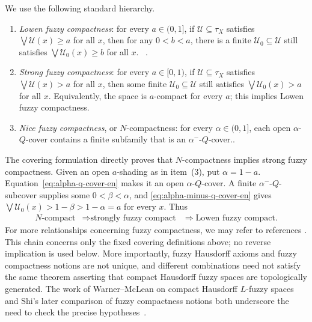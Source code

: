 \documentclass[11pt,a4paper]{article}
\numberwithin{equation}{section}
\theoremstyle{definition}
\theoremstyle{remark}
\begin{document}
We use the following standard hierarchy.
\begin{enumerate}[label=(\arabic*)]
 \item \emph{Lowen fuzzy compactness}: for every \(a\in(0,1]\), if
 \(\mathcal U\subseteq\tau_X\) satisfies
 \(\bigvee\mathcal U(x)\geq a\) for all \(x\), then for any $0<b<a$, there is a finite
 \(\mathcal U_0\subseteq\mathcal U\) still satisfies
 \(\bigvee\mathcal U_0(x)\geq b\) for all \(x\).
 ~\cite{Lowen1976-en,Lowen1978-en}.
 \item \emph{Strong fuzzy compactness}: for every \(a\in[0,1)\), if
 \(\mathcal U\subseteq\tau_X\) satisfies
 \(\bigvee\mathcal U(x)>a\) for all \(x\), then some finite
 \(\mathcal U_0\subseteq\mathcal U\) still satisfies
 \(\bigvee\mathcal U_0(x)>a\) for all \(x\).  Equivalently, the space
 is \(a\)-compact for every \(a\); this implies Lowen fuzzy compactness.
 \item \emph{Nice fuzzy compactness}, or \(N\)-compactness: for every
\(\alpha\in(0,1]\), each open \(\alpha\)-\(Q\)-cover contains a finite
subfamily that is an \(\alpha^{-}\)-\(Q\)-cover..
\end{enumerate}
The covering formulation directly proves that \(N\)-compactness
implies strong fuzzy compactness.  Given an open \(a\)-shading as in
item~(3), put \(\alpha=1-a\).  Equation~\eqref{eq:alpha-q-cover-en}
makes it an open \(\alpha\)-\(Q\)-cover.  A finite
\(\alpha^{-}\)-\(Q\)-subcover supplies some \(0<\beta<\alpha\), and
\eqref{eq:alpha-minus-q-cover-en} gives
\(\bigvee\mathcal U_0(x)>1-\beta>1-\alpha=a\) for every \(x\).
Thus
\begin{equation}\label{eq:compact-chain-en}
\begin{aligned}
 N\text{-compact}&\Longrightarrow
 \text{strongly fuzzy compact}
 &\Longrightarrow\text{Lowen fuzzy compact}.
\end{aligned}
\end{equation}
For more relationships concerning fuzzy compactness, we may refer to references \cite{Wang1985-cn,LiuLuo1997}. This chain concerns only the fixed covering definitions above; no
reverse implication is used below.  More importantly, fuzzy Hausdorff
axioms and fuzzy compactness notions are not unique, and different
combinations need not satisfy the same theorem asserting that compact
Hausdorff fuzzy spaces are topologically generated.  The work of
Warner--McLean on compact Hausdorff \(L\)-fuzzy spaces and Shi's later
comparison of fuzzy compactness notions both underscore the need to
check the precise hypotheses~\cite{WarnerMcLean1993-en,Shi2005-en}.
\end{document}
